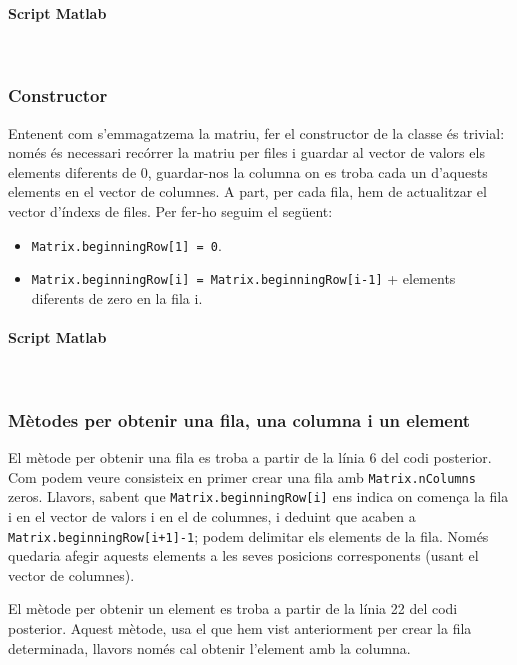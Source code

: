 \documentclass[11pt,a4paper,twoside]{report}
\begin{document}
\paragraph*{Script Matlab}\mbox{}\\



\subsubsection{Constructor}
\label{sec:Constructor}
Entenent com s'emmagatzema la matriu, fer el constructor de la classe és trivial: només és necessari recórrer la matriu per files i guardar al vector de valors els elements diferents de 0, guardar-nos la columna on es troba cada un d'aquests elements en el vector de columnes. A part, per cada fila, hem de actualitzar el vector d'índexs de files. Per fer-ho seguim el següent:
\begin{itemize}
\item \texttt{Matrix.beginningRow[1] = 0}.
\item \texttt{Matrix.beginningRow[i] = Matrix.beginningRow[i-1]} + elements diferents de zero en la fila i.
\end{itemize}

\paragraph*{Script Matlab} \mbox{} \\



\subsubsection{Mètodes per obtenir una fila, una columna i un element}

El mètode per obtenir una fila es troba a partir de la línia 6 del codi posterior. Com podem veure consisteix en primer crear una fila amb \texttt{Matrix.nColumns} zeros.
Llavors, sabent que \texttt{Matrix.beginningRow[i]} ens indica on comença la fila i en el vector de valors i en el de columnes, i deduint que acaben a \texttt{Matrix.beginningRow[i+1]-1}; podem delimitar els elements de la fila. Només quedaria afegir aquests elements a les seves posicions corresponents (usant el vector de columnes).

El mètode per obtenir un element es troba a partir de la línia 22 del codi posterior. Aquest mètode, usa el que hem vist anteriorment per crear la fila determinada, llavors només cal obtenir l'element amb la columna.
\end{document}
